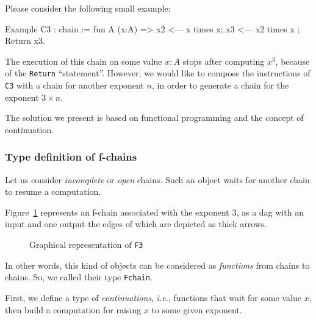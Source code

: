 Please consider the following small example:

\begin{Coqsrc}
Example C3 : chain :=
 fun A (x:A) =>
  x2 <--- x times x;
  x3 <--- x2 times x ;
  Return x3.
\end{Coqsrc}

The execution of this chain on  some value $x:A$ stops after 
computing \texttt{$x^3$}, because of the \texttt{Return} ``statement''.
However, we would like to compose the instructions of \texttt{C3} 
with a chain for another exponent $n$, in order to generate a chain for 
the exponent $3\times n$.

  The solution we present is based on functional programming and the concept of continuation.



\subsubsection{Type definition of  f-chains}

Let us   consider \emph{incomplete} or \emph{open} chains.
Such an object waits for another chain to resume  a computation.

Figure~\ref{fig:F3-as-dag} represents an  f-chain associated with the exponent $3$, as a dag with an input and one output the edges of which are depicted as thick arrows.

\begin{figure}[h]
  \centering
  \caption{Graphical representation of \texttt{F3}}
  \label{fig:F3-as-dag}
\end{figure}

In other words, this kind of objects can be considered as \emph{functions}
from chains to chains. So, we called their type \texttt{Fchain}.



First, we define a type of \emph{continuations},
\emph{i.e.},  functions  that wait for some value $x$, then 
build  a computation for raising {$x$} to some  given exponent.

